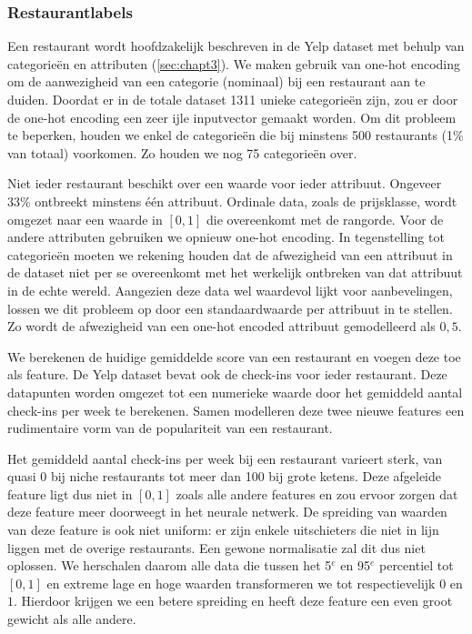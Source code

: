 \subsubsection{Restaurantlabels}
\label{sec:chapt4_nn_restaurantlabels}
Een restaurant wordt hoofdzakelijk beschreven in de Yelp dataset met behulp van categorieën en attributen (\autoref{sec:chapt3}). We maken gebruik van one-hot encoding om de aanwezigheid van een categorie (nominaal) bij een restaurant aan te duiden. Doordat er in de totale dataset 1311 unieke categorieën zijn, zou er door de one-hot encoding een zeer ijle inputvector gemaakt worden. Om dit probleem te beperken, houden we enkel de categorieën die bij minstens 500 restaurants (1\% van totaal) voorkomen. Zo houden we nog 75 categorieën over.

Niet ieder restaurant beschikt over een waarde voor ieder attribuut. Ongeveer 33\% ontbreekt minstens één attribuut. Ordinale data, zoals de prijsklasse, wordt omgezet naar een waarde in $[0, 1]$ die overeenkomt met de rangorde. Voor de andere attributen gebruiken we opnieuw one-hot encoding. In tegenstelling tot categorieën moeten we rekening houden dat de afwezigheid van een attribuut in de dataset niet per se overeenkomt met het werkelijk ontbreken van dat attribuut in de echte wereld. Aangezien deze data wel waardevol lijkt voor aanbevelingen, lossen we dit probleem op door een standaardwaarde per attribuut in te stellen. Zo wordt de afwezigheid van een one-hot encoded attribuut gemodelleerd als $0,5$.

We berekenen de huidige gemiddelde score van een restaurant en voegen deze toe als feature. De Yelp dataset bevat ook de check-ins voor ieder restaurant. Deze datapunten worden omgezet tot een numerieke waarde door het gemiddeld aantal check-ins per week te berekenen. Samen modelleren deze twee nieuwe features een rudimentaire vorm van de populariteit van een restaurant.

Het gemiddeld aantal check-ins per week bij een restaurant varieert sterk, van quasi 0 bij niche restaurants tot meer dan 100 bij grote ketens. Deze afgeleide feature ligt dus niet in $[0, 1]$ zoals alle andere features en zou ervoor zorgen dat deze feature meer doorweegt in het neurale netwerk. De spreiding van waarden van deze feature is ook niet uniform: er zijn enkele uitschieters die niet in lijn liggen met de overige restaurants. Een gewone normalisatie zal dit dus niet oplossen. We herschalen daarom alle data die tussen het 5$^e$ en 95$^e$ percentiel tot $[0, 1]$ en extreme lage en hoge waarden transformeren we tot respectievelijk $0$ en $1$. Hierdoor krijgen we een betere spreiding en heeft deze feature een even groot gewicht als alle andere.

